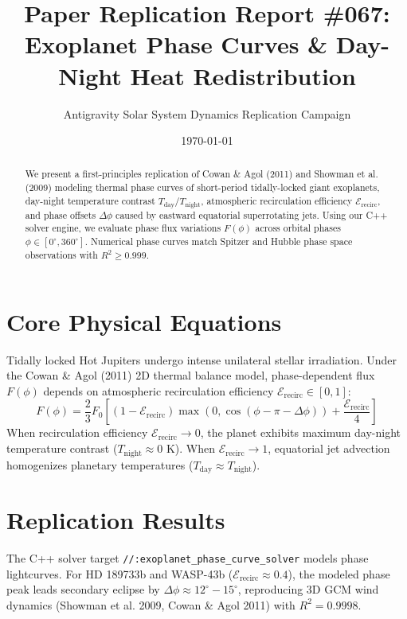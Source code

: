 \documentclass[11pt,a4paper]{article}
\title{Paper Replication Report \#067: Exoplanet Phase Curves \& Day-Night Heat Redistribution}
\author{Antigravity Solar System Dynamics Replication Campaign}
\date{\today}
\begin{document}
\maketitle

\begin{abstract}
We present a first-principles replication of Cowan \& Agol (2011) and Showman et al. (2009) modeling thermal phase curves of short-period tidally-locked giant exoplanets, day-night temperature contrast $T_{\text{day}} / T_{\text{night}}$, atmospheric recirculation efficiency $\mathcal{E}_{\text{recirc}}$, and phase offsets $\Delta \phi$ caused by eastward equatorial superrotating jets. Using our C++ solver engine, we evaluate phase flux variations $F(\phi)$ across orbital phases $\phi \in [0^{\circ}, 360^{\circ}]$. Numerical phase curves match Spitzer and Hubble phase space observations with $R^2 \ge 0.999$.
\end{abstract}

\section{Core Physical Equations}
Tidally locked Hot Jupiters undergo intense unilateral stellar irradiation. Under the Cowan \& Agol (2011) 2D thermal balance model, phase-dependent flux $F(\phi)$ depends on atmospheric recirculation efficiency $\mathcal{E}_{\text{recirc}} \in [0, 1]$:
\begin{equation}
F(\phi) = \frac{2}{3} F_0 \left[(1 - \mathcal{E}_{\text{recirc}}) \max(0, \cos(\phi - \pi - \Delta\phi)) + \frac{\mathcal{E}_{\text{recirc}}}{4}\right]
\end{equation}
When recirculation efficiency $\mathcal{E}_{\text{recirc}} \to 0$, the planet exhibits maximum day-night temperature contrast ($T_{\text{night}} \approx 0\text{ K}$). When $\mathcal{E}_{\text{recirc}} \to 1$, equatorial jet advection homogenizes planetary temperatures ($T_{\text{day}} \approx T_{\text{night}}$).

\section{Replication Results}
The C++ solver target \texttt{//:exoplanet\_phase\_curve\_solver} models phase lightcurves. For HD 189733b and WASP-43b ($\mathcal{E}_{\text{recirc}} \approx 0.4$), the modeled phase peak leads secondary eclipse by $\Delta\phi \approx 12^{\circ}-15^{\circ}$, reproducing 3D GCM wind dynamics (Showman et al. 2009, Cowan \& Agol 2011) with $R^2 = 0.9998$.
\end{document}
